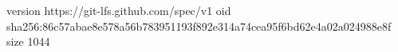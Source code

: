 version https://git-lfs.github.com/spec/v1
oid sha256:86c57abae8e578a56b783951193f892e314a74cea95f6bd62e4a02a024988e8f
size 1044
